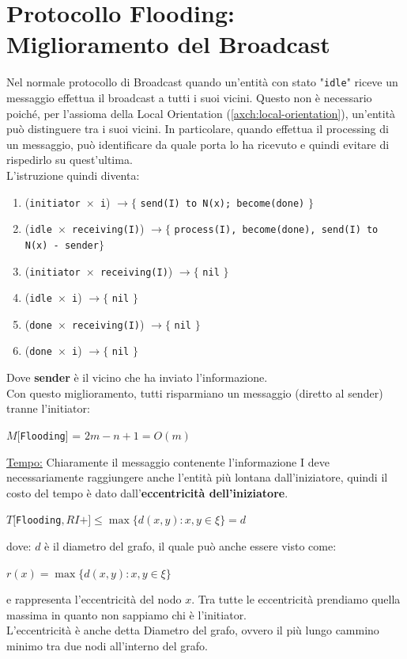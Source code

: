 \section{Protocollo Flooding: Miglioramento del Broadcast}
Nel normale protocollo di Broadcast quando un'entità con stato "\texttt{idle}"
riceve un messaggio effettua il broadcast a tutti i suoi vicini. Questo non è
necessario poiché, per l'assioma della Local Orientation
(\ref{axch:local-orientation}), un'entità può distinguere tra i suoi vicini. In
particolare, quando effettua il processing di un messaggio, può identificare da
quale porta lo ha ricevuto e quindi evitare di rispedirlo su quest'ultima.\\
L'istruzione quindi diventa:

\begin{enumerate}
    \item (\texttt{initiator $\times$ i}) $\rightarrow \lbrace$ \texttt{send(I) to N(x);
              become(done)} $\rbrace$
    \item (\texttt{idle $\times$ receiving(I)}) $\rightarrow \lbrace$ \texttt{process(I),
          become(done), send(I) to N(x) - {sender}}$\rbrace$
    \item (\texttt{initiator $\times$ receiving(I)}) $\rightarrow \lbrace$ \texttt{nil}
          $\rbrace$
    \item (\texttt{idle $\times$ i}) $\rightarrow \lbrace$ \texttt{nil} $\rbrace$
    \item (\texttt{done $\times$ receiving(I)}) $\rightarrow \lbrace$ \texttt{nil}
          $\rbrace$
    \item (\texttt{done $\times$ i}) $\rightarrow \lbrace$ \texttt{nil} $\rbrace$
\end{enumerate}
Dove \textbf{sender} è il vicino che ha inviato l'informazione.\\
Con questo miglioramento, tutti risparmiano un messaggio (diretto al sender)
tranne l'initiator:
\begin{center}
    $M[$\texttt{Flooding}] = $2m-n+1=O(m)$
\end{center}

\underline{Tempo:}
Chiaramente il messaggio contenente l'informazione I deve necessariamente
raggiungere anche l'entità più lontana dall'iniziatore, quindi il costo del
tempo è dato dall'\textbf{eccentricità dell'iniziatore}.
\begin{center}
    $T[$\texttt{Flooding}$, RI+] \leq \max \lbrace d(x,y) : x, y \in \xi \rbrace =
        d$
\end{center}
dove: $d$ è il diametro del grafo, il quale può anche essere visto come:
\begin{center}
    $r(x) = \max \lbrace d(x, y) : x, y \in \xi \rbrace$
\end{center}
e rappresenta l'eccentricità del nodo $x$. Tra tutte le eccentricità prendiamo
quella massima in quanto non sappiamo chi è l'initiator.\\
L'eccentricità è anche detta Diametro del grafo, ovvero il più lungo cammino
minimo tra due nodi all'interno del grafo.

